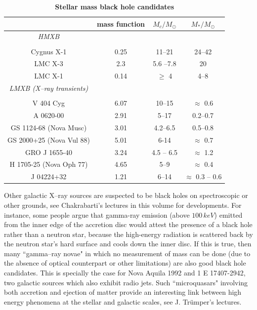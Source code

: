 \documentclass{lamuphys}
\begin{document}
\begin{table}
\caption{\label{luminet:B}
{\bf Stellar mass black hole candidates}}
\begin{center}
\begin{tabular}{|c|c|c|c|}
\hline
      & mass function & $M_{c}/M_{\odot}$ & $M_{*}/M_{\odot}$     \\ \hline
{\it HMXB}  &      &  &      \\
            &      &  &      \\
 Cygnus X-1     & 0.25      &  11--21 &  24--42  \\
LMC X-3  & 2.3 & 5.6 --7.8 &  20  \\
LMC X-1      &0.14  & $\geq$ 4 &  4--8 \\ \hline
{\it LMXB (X--ray transients)}      &  &   &  \\
            &      &  &      \\
            V 404 Cyg      & 6.07  & 10--15 & $\approx$ 0.6  \\ 
A 0620-00      & 2.91  &  5--17 &  0.2--0.7 \\
GS 1124-68 (Nova Musc)      & 3.01  &  4.2--6.5 &  0.5--0.8  \\
GS 2000+25 (Nova Vul 88)  & 5.01 &  6-14 & $\approx$ 0.7  \\
   GRO J 1655-40   & 3.24& 4.5 -- 6.5 & $\approx$ 1.2\\
  H 1705-25 (Nova Oph 77)    & 4.65 &  5--9 &  $\approx$ 0.4\\
J 04224+32      & 1.21  & 6--14 & $\approx$ 0.3 -- 0.6  \\
\hline
\end{tabular}
\end{center}
\end{table}

Other galactic X--ray sources are suspected to be black holes on 
spectroscopic or other grounds, see Chakrabarti's lectures in this 
volume for developments. For instance, some people argue that gamma-ray 
emission (above $100 \, keV$) emitted from the inner edge of the 
accretion disc would attest the presence of a black hole rather than a 
neutron star, because the high-energy radiation is scattered back by the neutron star's hard surface and cools down the 
inner disc. If this is true, then many ``gamma--ray novae" in which no 
measurement of mass can be done (due to the absence of optical 
counterpart or other limitations) are also good black hole 
candidates. This is specially the case for Nova Aquila 1992 and 1 E 
17407-2942, two galactic sources which also exhibit radio jets. Such 
 ``microquasars" involving both accretion and ejection of matter provide an interesting 
 link between high energy phenomena at the stellar and galactic scales, 
 see J. Tr\"umper's lectures.
 
\end{document}
